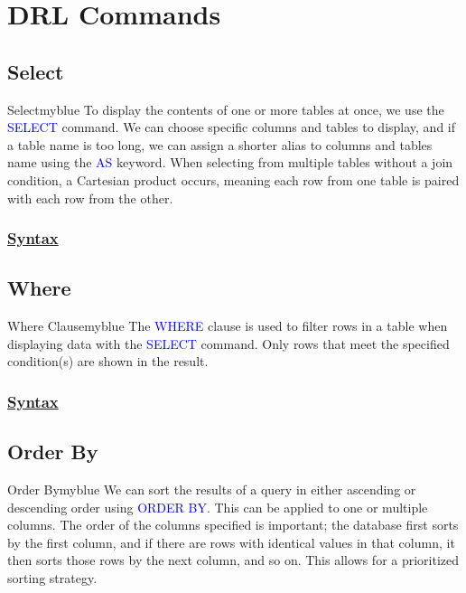\section{DRL Commands}
\subsection{Select}


\begin{prettyBox}{Select}{myblue}
To display the contents of one or more tables at once, we use the \textcolor{blue}{SELECT} command. We can choose
specific columns and tables to display, and if a table name is too long, we can assign a shorter alias to columns and 
tables name using the \textcolor{blue}{AS} keyword. When selecting from multiple tables without a join condition, a Cartesian product occurs, meaning each row from one table is paired with each row from the other.
\end{prettyBox}

\subsubsection*{\underline{Syntax}}



\subsection{Where}

\begin{prettyBox}{Where Clause}{myblue}
The \textcolor{blue}{WHERE} clause is used to filter rows in a table when displaying data with the
\textcolor{blue}{SELECT} command. Only rows that meet the specified condition(s) are shown in the result.
\end{prettyBox}

\subsubsection*{\underline{Syntax}}



\subsection{Order By}

\begin{prettyBox}{Order By}{myblue}
We can sort the results of a query in either ascending or descending order using \textcolor{blue}{ORDER BY}. 
This can be applied to one or multiple columns. The order of the columns specified is important; the database
first sorts by the first column, and if there are rows with identical values in that column, it then sorts those
rows by the next column, and so on. This allows for a prioritized sorting strategy.
\end{prettyBox}

